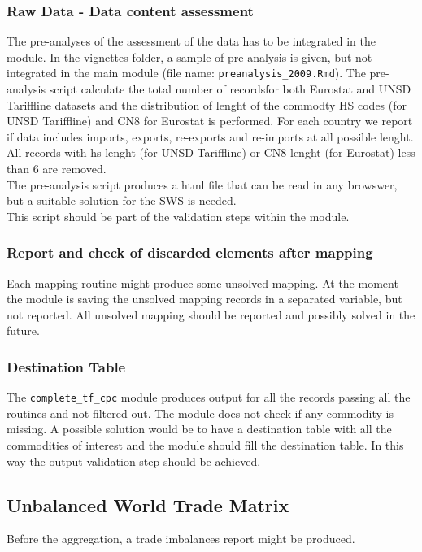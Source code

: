 \documentclass[nojss]{jss}\usepackage[]{graphicx}\usepackage[]{color}
\begin{document}
\subsubsection{Raw Data - Data content assessment}
The pre-analyses of the assessment of the data has to be integrated in the module. In the vignettes folder, a sample of pre-analysis is given, but not integrated in the main module (file name: {\tt preanalysis\_2009.Rmd}). The pre-analysis script calculate the total number of recordsfor both Eurostat and UNSD Tariffline datasets and the distribution of lenght of the commodty HS codes (for UNSD Tariffline) and CN8 for Eurostat is performed. For each country we report if data includes imports, exports, re-exports and re-imports at all possible lenght.\\
All records with hs-lenght (for UNSD Tariffline) or CN8-lenght (for Eurostat) less than 6 are removed.\\
The pre-analysis script produces a html file that can be read in any browswer, but a suitable solution for the SWS is needed.\\
This script should be part of the validation steps within the module.

\subsubsection{Report and check of discarded elements after mapping}
Each mapping routine might produce some unsolved mapping. At the moment the module is saving the unsolved mapping records in a separated variable, but not reported. All unsolved mapping should be reported and possibly solved in the future.

\subsubsection{Destination Table}
The {\tt complete\_tf\_cpc} module produces output for all the records passing all the routines and not filtered out. The module does not check if any commodity is missing. A possible solution would be to have a destination table with all the commodities of interest and the module should fill the destination table. In this way the output validation step should be achieved.

\subsection{Unbalanced World Trade Matrix}
Before the aggregation, a trade imbalances report might be produced.
\end{document}
